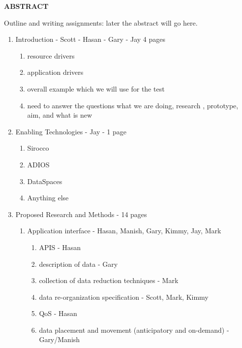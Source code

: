 \vspace{-\belowdisplayskip}
\vspace{-\abovedisplayskip}
\medskip

\begin{center}
\textbf{ABSTRACT}
\end{center}

\vspace{-\belowdisplayskip}

\enlargethispage{2\baselineskip}

\noindent
Outline and writing assignments:
later the abstract will go here.
\begin{enumerate}
\item Introduction - Scott - Hasan - Gary - Jay 4 pages
   \begin{enumerate}
      \item resource drivers
      \item application drivers
      \item overall example which we will use for the test
      \item  need to answer the questions what we are doing, research  , prototype, aim, and what is new
   \end{enumerate}
\item Enabling Technologies - Jay - 1 page
   \begin{enumerate}
   	\item Sirocco
   	\item ADIOS
   	\item DataSpaces
   	\item Anything else
   \end{enumerate}
 \item {Proposed Research and Methods} - 14 pages
    \begin{enumerate}
       \item Application interface - Hasan, Manish, Gary, Kimmy, Jay, Mark
          \begin{enumerate}
            \item APIS - Hasan
            \item description of data - Gary
            \item collection of data reduction techniques - Mark
            \item data re-organization specification - Scott, Mark, Kimmy
            \item QoS - Hasan
            \item data placement and movement (anticipatory and on-demand)  - Gary/Manish

\end{enumerate}
\end{enumerate}
\end{enumerate}
